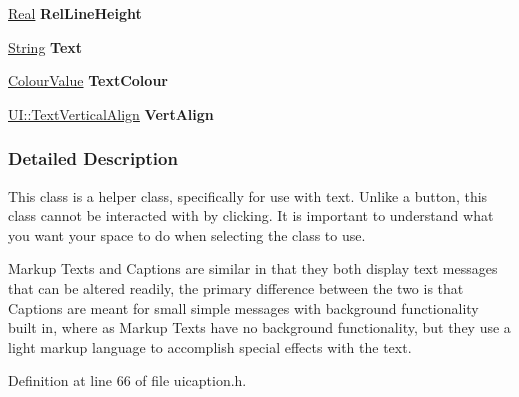 \begin{DoxyCompactItemize}
\item 
\hypertarget{classMezzanine_1_1UI_1_1Caption_a2c093e275b717f8e7f7d13d3a78078e1}{
\hyperlink{namespaceMezzanine_a726731b1a7df72bf3583e4a97282c6f6}{Real} {\bfseries RelLineHeight}}
\label{classMezzanine_1_1UI_1_1Caption_a2c093e275b717f8e7f7d13d3a78078e1}

\item 
\hypertarget{classMezzanine_1_1UI_1_1Caption_a6675801531fe2229e10e4fa1b56c6909}{
\hyperlink{namespaceMezzanine_acf9fcc130e6ebf08e3d8491aebcf1c86}{String} {\bfseries Text}}
\label{classMezzanine_1_1UI_1_1Caption_a6675801531fe2229e10e4fa1b56c6909}

\item 
\hypertarget{classMezzanine_1_1UI_1_1Caption_a95220bb16dfe1e344cfb359988abdec8}{
\hyperlink{classMezzanine_1_1ColourValue}{ColourValue} {\bfseries TextColour}}
\label{classMezzanine_1_1UI_1_1Caption_a95220bb16dfe1e344cfb359988abdec8}

\item 
\hypertarget{classMezzanine_1_1UI_1_1Caption_a17337615a192033d8f7acc84ac24c0c9}{
\hyperlink{namespaceMezzanine_1_1UI_ab35e3845e2541698245262cc17147ae9}{UI::TextVerticalAlign} {\bfseries VertAlign}}
\label{classMezzanine_1_1UI_1_1Caption_a17337615a192033d8f7acc84ac24c0c9}

\end{DoxyCompactItemize}


\subsubsection{Detailed Description}
This class is a helper class, specifically for use with text. Unlike a button, this class cannot be interacted with by clicking. It is important to understand what you want your space to do when selecting the class to use. \par
 \par
 Markup Texts and Captions are similar in that they both display text messages that can be altered readily, the primary difference between the two is that Captions are meant for small simple messages with background functionality built in, where as Markup Texts have no background functionality, but they use a light markup language to accomplish special effects with the text. 

Definition at line 66 of file uicaption.h.



